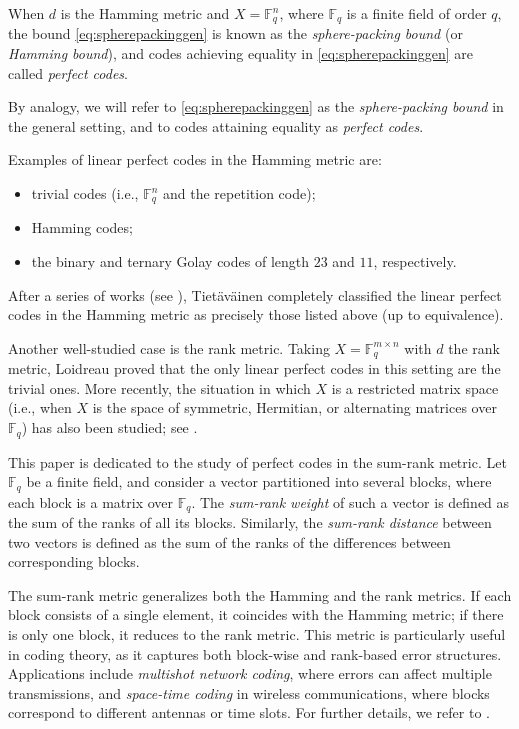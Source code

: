 \documentclass[11pt]{amsart}
\theoremstyle{definition}
\newcommand{\fq}{{\mathbb F}_{q}}
\begin{document}
When $d$ is the Hamming metric and $X=\mathbb{F}_q^n$, where $\fq$ is a finite field of order $q$, the bound \eqref{eq:spherepackinggen} is known as the \emph{sphere-packing bound} (or \emph{Hamming bound}), and codes achieving equality in \eqref{eq:spherepackinggen} are called \emph{perfect codes}.  

By analogy, we will refer to \eqref{eq:spherepackinggen} as the \emph{sphere-packing bound} in the general setting, and to codes attaining equality as \emph{perfect codes}.

Examples of linear perfect codes in the Hamming metric are:
\begin{itemize}
    \item trivial codes (i.e., $\mathbb{F}_q^n$ and the repetition code);
    \item Hamming codes;
    \item the binary and ternary Golay codes of length $23$ and $11$, respectively.
\end{itemize}
After a series of works (see \cite{cohen1964note,alter1968nonexistence,alter1968non,van1971nonexistence,van1970nonexistence,van1969nonexistence,shapiro1959mathematical,tietavainen1956there}), 
Tiet{\"a}v{\"a}inen \cite{tietavainen1973nonexistence} completely classified the linear perfect codes in the Hamming metric as precisely those listed above (up to equivalence).

Another well-studied case is the rank metric. 
Taking $X=\mathbb{F}_q^{m\times n}$ with $d$ the rank metric, Loidreau \cite{loidreau2006properties} proved that the only linear perfect codes in this setting are the trivial ones.  
More recently, the situation in which $X$ is a restricted matrix space (i.e., when $X$ is the space of symmetric, Hermitian, or alternating matrices over $\mathbb{F}_q$) has also been studied; see \cite{mushrraf2025perfect,mushrraf2024perfect,abiad2025eigenvalue}.

This paper is dedicated to the study of perfect codes in the sum-rank metric.  
Let $\mathbb{F}_q$ be a finite field, and consider a vector partitioned into several blocks, where each block is a matrix over $\mathbb{F}_q$. The \emph{sum-rank weight} of such a vector is defined as the sum of the ranks of all its blocks. Similarly, the \emph{sum-rank distance} between two vectors is defined as the sum of the ranks of the differences between corresponding blocks.  

The sum-rank metric generalizes both the Hamming and the rank metrics. If each block consists of a single element, it coincides with the Hamming metric; if there is only one block, it reduces to the rank metric. This metric is particularly useful in coding theory, as it captures both block-wise and rank-based error structures. Applications include \emph{multishot network coding}, where errors can affect multiple transmissions, and \emph{space-time coding} in wireless communications, where blocks correspond to different antennas or time slots. For further details, we refer to \cite{byrne2021fundamental,martinez2022codes,martinez2019universal}.  
\end{document}
